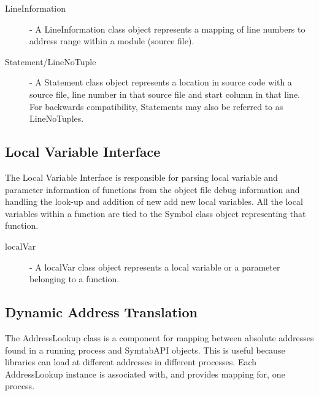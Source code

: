 \begin{description}
\item[LineInformation] - A LineInformation class object represents a mapping of line numbers to address range within a module (source file). 
\item[Statement/LineNoTuple] - A Statement class object represents a location in source code with a source file, line number in that source file and start column in that line. For backwards compatibility, Statements may also be referred to as LineNoTuples. 
\end{description}

\subsection{Local Variable Interface}
The Local Variable Interface is responsible for parsing local variable and parameter information of functions from the object file debug information and handling the look-up and addition of new add new local variables. All the local variables within a function are tied to the Symbol class object representing that function.
\begin{description}
\item[localVar] - A localVar class object represents a local variable or a parameter belonging to a function.
\end{description}

\subsection{Dynamic Address Translation}
The AddressLookup class is a component for mapping between absolute addresses found in a running process and SymtabAPI objects. This is useful because libraries can load at different addresses in different processes. Each AddressLookup instance is associated with, and provides mapping for, one process.

